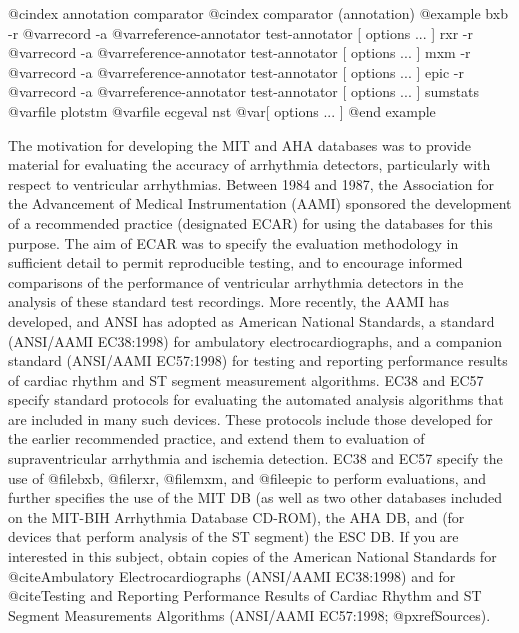 {{{{{{{{{@cindex annotation comparator
@cindex comparator (annotation)
@example
bxb -r @var{record} -a @var{reference-annotator test-annotator [ options ... ]}
rxr -r @var{record} -a @var{reference-annotator test-annotator [ options ... ]}
mxm -r @var{record} -a @var{reference-annotator test-annotator [ options ... ]}
epic -r @var{record} -a @var{reference-annotator test-annotator [ options ... ]}
sumstats @var{file}
plotstm @var{file}
ecgeval
nst @var{[ options ... ]}
@end example

The motivation for developing the MIT and AHA databases was to provide
material for evaluating the accuracy of arrhythmia detectors,
particularly with respect to ventricular arrhythmias.  Between 1984 and
1987, the Association for the Advancement of Medical Instrumentation
(AAMI) sponsored the development of a recommended practice (designated
ECAR) for using the databases for this purpose.  The aim of ECAR was to
specify the evaluation methodology in sufficient detail to permit
reproducible testing, and to encourage informed comparisons of the
performance of ventricular arrhythmia detectors in the analysis of these
standard test recordings.  More recently, the AAMI has developed, and
ANSI has adopted as American National Standards, a standard (ANSI/AAMI
EC38:1998) for ambulatory electrocardiographs, and a companion standard
(ANSI/AAMI EC57:1998) for testing and reporting performance results of
cardiac rhythm and ST segment measurement algorithms.  EC38 and EC57
specify standard protocols for evaluating
the automated analysis algorithms that are included in many such
devices.  These protocols include those developed for the earlier
recommended practice, and extend them to evaluation of supraventricular
arrhythmia and ischemia detection.  EC38 and EC57 specify the use of
@file{bxb}, @file{rxr}, @file{mxm}, and @file{epic} to perform
evaluations, and further specifies the use of the MIT DB (as well as two
other databases included on the MIT-BIH Arrhythmia Database CD-ROM), the
AHA DB, and (for devices that perform analysis of the ST segment) the
ESC DB.  If you are interested in this subject, obtain copies of the
American National Standards for @cite{Ambulatory Electrocardiographs}
(ANSI/AAMI EC38:1998) and for @cite{Testing and Reporting Performance
Results of Cardiac Rhythm and ST Segment Measurements Algorithms} (ANSI/AAMI
EC57:1998; @pxref{Sources}).

}}}}}}}}}
